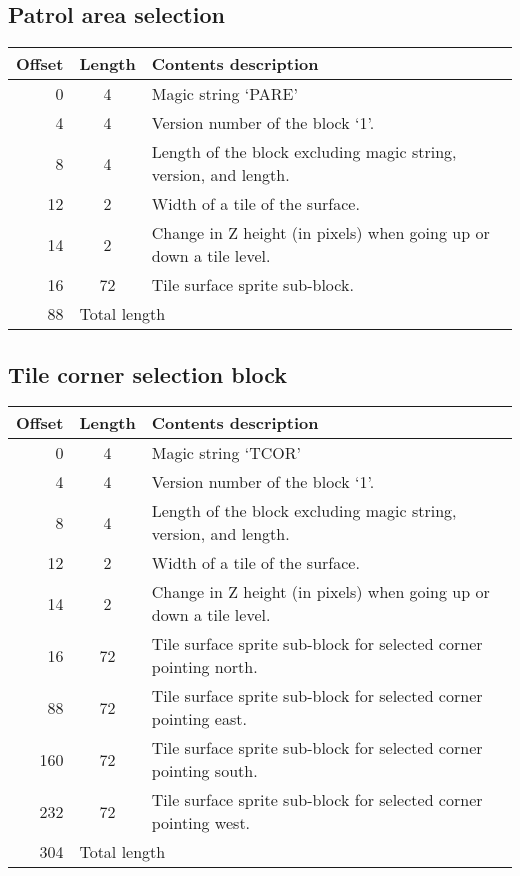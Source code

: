 \documentclass{article}
\begin{document}
\subsection{Patrol area selection}
\begin{center}
\begin{tabular}{|r|c|l|} \hline
\textbf{Offset} & \textbf{Length} & \textbf{Contents description} \\ \hline
   0 &  4 & Magic string `PARE' \\
   4 &  4 & Version number of the block `1'. \\
   8 &  4 & Length of the block excluding magic string, version, and length. \\
  12 &  2 & Width of a tile of the surface. \\
  14 &  2 & Change in Z height (in pixels) when going up or down a tile level. \\
  16 & 72 & Tile surface sprite sub-block. \\ \hline
  88 & \multicolumn{2}{l|}{Total length} \\ \hline
\end{tabular}
\end{center}


\subsection{Tile corner selection block}
\begin{center}
\begin{tabular}{|r|c|l|} \hline
\textbf{Offset} & \textbf{Length} & \textbf{Contents description} \\ \hline
   0 &  4 & Magic string `TCOR' \\
   4 &  4 & Version number of the block `1'. \\
   8 &  4 & Length of the block excluding magic string, version, and length. \\
  12 &  2 & Width of a tile of the surface. \\
  14 &  2 & Change in Z height (in pixels) when going up or down a tile level. \\
  16 & 72 & Tile surface sprite sub-block for selected corner pointing north. \\
  88 & 72 & Tile surface sprite sub-block for selected corner pointing east. \\
 160 & 72 & Tile surface sprite sub-block for selected corner pointing south. \\
 232 & 72 & Tile surface sprite sub-block for selected corner pointing west. \\ \hline
 304 & \multicolumn{2}{l|}{Total length} \\ \hline
\end{tabular}
\end{center}
\end{document}

